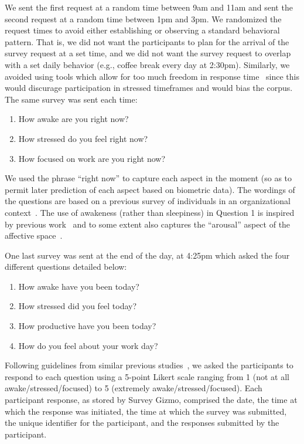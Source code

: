 We sent the 
first request at a random time between 9am and 11am 
and sent the second request at a random time between 1pm and 3pm. We 
randomized the request times to avoid either establishing or observing a 
standard behavioral pattern. That is, we did not want the participants to 
plan for the arrival of the survey request at a set time, and we did not 
want the survey request to overlap with a set daily behavior (e.g., coffee 
break every day at 2:30pm). Similarly, we avoided using tools which allow 
for too much freedom in response time~\cite{Adams18} since this would 
discurage participation in stressed timeframes and would bias the 
corpus. 
The same survey was sent each time:
\begin{enumerate}
\item How awake are you right now?
\item How stressed do you feel right now?
\item How focused on work are you right now? 
\end{enumerate}
We used the phrase ``right now'' to capture each aspect in the moment (so as to permit later prediction of each aspect based on biometric data). The wordings of the questions are based on a previous survey of individuals in an organizational context~\cite{Gloor_etal:2010}. The use of awakeness (rather than sleepiness) in Question 1 is inspired by previous work~\cite{Wilhelm_Schoebi:2007} and to some extent also captures the ``arousal'' aspect of the affective space~\cite{Russell:1980}.


One last survey was sent at the end of the day, at 4:25pm which asked the 
four different questions
detailed below:
\begin{enumerate}
\item How awake have you been today?
\item How stressed did you feel today?
\item How productive have you been today?
\item How do you feel about your work day?
\end{enumerate}

Following guidelines from similar previous studies~\cite{fogarty05,tanaka11}, we asked the participants to respond to each question using a 5-point Likert scale ranging from 1 (not at all awake/stressed/focused) to 5 (extremely awake/stressed/focused). Each participant response, as stored by Survey Gizmo, comprised the date, the time at which the response was initiated, the time at which the survey was submitted, the unique identifier for the participant, and the responses submitted by the participant.

